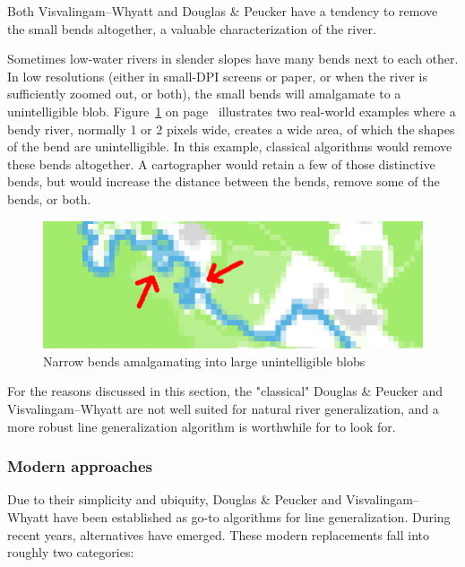 \documentclass[a4paper]{article}
\newcommand{\onpage}[1]{\ref{#1} on page~\pageref{#1}}
\newcommand{\DP}{Douglas \& Peucker}
\newcommand{\VW}{Visvalingam--Whyatt}
\begin{document}
Both {\VW} and {\DP} have a tendency to remove the small bends altogether, a
valuable characterization of the river.

Sometimes low-water rivers in slender slopes have many bends next to each
other. In low resolutions (either in small-DPI screens or paper, or when the
river is sufficiently zoomed out, or both), the small bends will amalgamate to
a unintelligible blob. Figure~\onpage{fig:pixel-amalgamation} illustrates two
real-world examples where a bendy river, normally 1 or 2 pixels wide, creates a
wide area, of which the shapes of the bend are unintelligible. In this example,
classical algorithms would remove these bends altogether. A cartographer would
retain a few of those distinctive bends, but would increase the distance
between the bends, remove some of the bends, or both.

\begin{figure}[h]
    \includegraphics[width=\textwidth]{amalgamate1}
    \caption{Narrow bends amalgamating into large unintelligible blobs}
    \label{fig:pixel-amalgamation}
\end{figure}

For the reasons discussed in this section, the "classical" {\DP} and {\VW} are
not well suited for natural river generalization, and a more robust line
generalization algorithm is worthwhile for to look for.

\subsubsection{Modern approaches}


Due to their simplicity and ubiquity, {\DP} and {\VW} have been established as
go-to algorithms for line generalization. During recent years, alternatives
have emerged. These modern replacements fall into roughly two categories:
\end{document}
